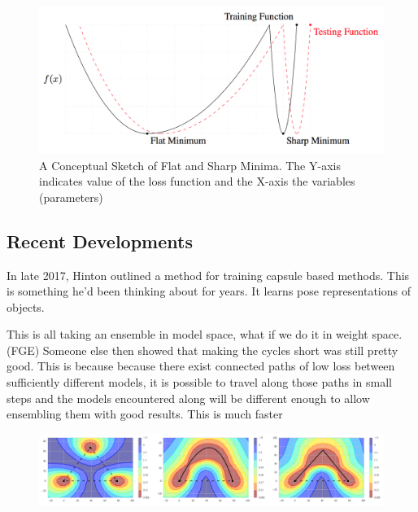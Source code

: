 \begin{figure}
    \centering
    \includegraphics[width=\textwidth]{./img/Wide_optima.png}
    \caption{A Conceptual Sketch of Flat and Sharp Minima. The Y-axis indicates value of the loss function and the X-axis the variables (parameters) \cite{Keskar_Mudigere_Nocedal_Smelyanskiy_Tang_2016}}
    \label{fig:wide_optima}
\end{figure}


\subsection{Recent Developments}\label{subsec:recent_improvements}
In late 2017, Hinton outlined a method for training capsule based methods.
This is something he'd been thinking about for years.
It learns pose representations of objects. \cite{Hinton_Sabour_Frosst_2018, Sabour_Frosst_Hinton_2017}



This is all taking an ensemble in model space, what if we do it in weight space.
(FGE) Someone else then showed that making the cycles short was still pretty good.
This is because because there exist connected paths of low loss between sufficiently different models, it is possible to travel along those paths in small steps and the models encountered along will be different enough to allow ensembling them with good results.
This is much faster
\cite{Garipov_Izmailov_Podoprikhin_Vetrov_Wilson_2018}



\begin{figure}
    \centering
    \includegraphics[width=\textwidth]{./img/FGE.png}
    \caption{}
    \label{fig:FGE_shortest_path}
\end{figure}

